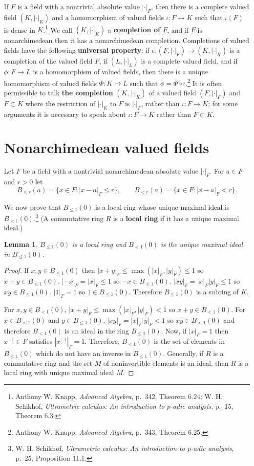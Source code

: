 \documentclass{article}
\newtheorem{lemma}[theorem]{Lemma}
\theoremstyle{definition}
\begin{document}
If $F$ is a field with a nontrivial absolute value $|\cdot|_F$, 
then there is a complete valued field $(K,|\cdot|_K)$ and a homomorphism of valued fields
$\iota:F \to K$ such that $\iota(F)$ is dense in $K$.\footnote{Anthony W. Knapp,
{\em Advanced Algebra}, p.~342, Theorem 6.24; 
W. H. Schikhof, {\em Ultrametric calculus: An introduction to $p$-adic analysis}, p.~15, Theorem 6.3.}
We call $(K,|\cdot|_K)$ a \textbf{completion of $F$}, and if $F$ is nonarchimedean then it has a nonarchimedean completion.
Completions of valued fields have the following \textbf{universal property}: 
if $\iota:(F,|\cdot|_F) \to (K,|\cdot|_K)$ is a completion of the valued field $F$, if 
$(L,|\cdot|_L)$ is a complete valued field, and if $\phi:F \to L$ is a homomorphism of valued fields, then
there is a unique homomorphism of valued fields 
$\Phi:K \to L$ such that $\phi = \Phi \circ \iota$.\footnote{Anthony W. Knapp,
{\em Advanced Algebra}, p.~343, Theorem 6.25.}
It is often permissible to talk \textbf{the completion} $(K,|\cdot|_K)$ of a valued field 
$(F,|\cdot|_F)$ and $F \subset K$ where the restriction of $|\cdot|_K$ to $F$ is $|\cdot|_F$, rather than
$\iota:F \to K$; for some arguments it is necessary to speak about $\iota:F \to K$ rather than $F \subset K$.  


\section{Nonarchimedean valued fields}
Let $F$ be a field with a nontrivial nonarchimedean absolute value $|\cdot|_F$. For $a \in F$ and $r>0$ let
\[
B_{\leq r}(a) = \{x \in F : |x-a|_F \leq r\},
\qquad B_{< r}(a) = \{x \in F : |x-a|_F < r\}.
\]


We now prove that $B_{\leq 1}(0)$ is a local ring whose unique maximal ideal is $B_{<1}(0)$.\footnote{W. H. Schikhof, {\em Ultrametric calculus: An introduction to $p$-adic analysis}, p.~25, Proposition 11.1.}
(A commutative ring $R$ is a \textbf{local ring} if it has a unique maximal ideal.)

\begin{lemma}
$B_{\leq 1}(0)$ is a local ring and 
$B_{<1}(0)$ is the unique maximal ideal in $B_{\leq 1}(0)$.
\end{lemma}
\begin{proof}
If  $x,y \in B_{\leq 1}(0)$ then $|x+y|_F \leq \max(|x|_F,|y|_F) \leq 1$ so $x+y \in B_{\leq 1}(0)$. 
$|-x|_F = |x|_F \leq 1$ so $-x \in B_{\leq 1}(0)$. $|xy|_F = |x|_F |y|_F \leq 1$ so
$xy \in B_{\leq 1}(0)$. $|1|_F = 1$ so $1 \in B_{\leq 1}(0)$. Therefore $B_{\leq 1}(0)$ is a subring of $K$.

For $x,y \in B_{<1}(0)$, $|x+y|_F \leq \max(|x|_F,|y|_F) < 1$ so $x+y \in B_{<1}(0)$. For $x \in B_{<1}(0)$ and $y \in B_{\leq 1}(0)$,
$|xy|_F = |x|_F |y|_F < 1$ so $xy \in B_{<1}(0)$ and therefore $B_{<1}(0)$ is an ideal in the ring $B_{\leq 1}(0)$. 
Now, if $|x|_F =1$ then $x^{-1} \in F$ satisfies $|x^{-1}|_F = 1$. 
Therefore, $B_{<1}(0)$ is the set of elements in $B_{\leq 1}(0)$ which do not have an inverse in $B_{\leq 1}(0)$. Generally,
if $R$ is a commutative ring and the set $M$ of noninvertible elements is an ideal, then $R$ is a local ring with unique maximal ideal $M$.
\end{proof}
\end{document}
